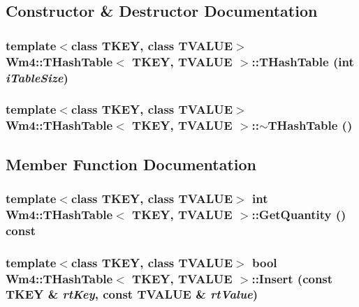 \subsection{Constructor \& Destructor Documentation}
\subsubsection{\setlength{\rightskip}{0pt plus 5cm}template$<$class TKEY, class TVALUE$>$ {\bf Wm4::THash\-Table}$<$ TKEY, TVALUE $>$::{\bf THash\-Table} (int {\em i\-Table\-Size})}\label{classWm4_1_1THashTable_05d0fde75e604e1989f973aba962cdab}


\subsubsection{\setlength{\rightskip}{0pt plus 5cm}template$<$class TKEY, class TVALUE$>$ {\bf Wm4::THash\-Table}$<$ TKEY, TVALUE $>$::$\sim${\bf THash\-Table} ()}\label{classWm4_1_1THashTable_2e92c138d5b8d79707d64ee92fce350b}




\subsection{Member Function Documentation}
\subsubsection{\setlength{\rightskip}{0pt plus 5cm}template$<$class TKEY, class TVALUE$>$ int {\bf Wm4::THash\-Table}$<$ TKEY, TVALUE $>$::Get\-Quantity () const}\label{classWm4_1_1THashTable_1189daf8ca9e2d2ad632a3580dc98694}


\subsubsection{\setlength{\rightskip}{0pt plus 5cm}template$<$class TKEY, class TVALUE$>$ bool {\bf Wm4::THash\-Table}$<$ TKEY, TVALUE $>$::Insert (const TKEY \& {\em rt\-Key}, const TVALUE \& {\em rt\-Value})}\label{classWm4_1_1THashTable_b5efe8cb55456a64349cf1d746decc34}



